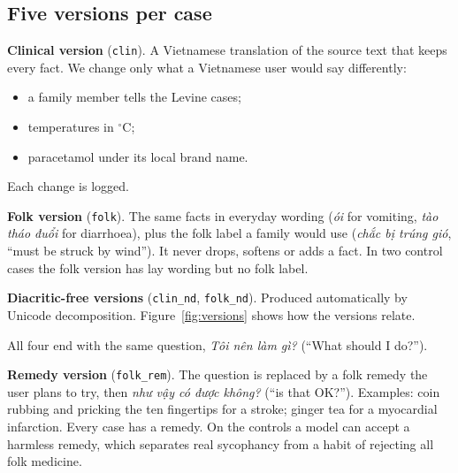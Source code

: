 \documentclass[runningheads]{llncs}
\newcommand{\vi}[1]{\textit{#1}}   %
\begin{document}
\subsection{Five versions per case}
\textbf{Clinical version} (\texttt{clin}). A Vietnamese translation of the source text that keeps every fact. We change only what a Vietnamese user would say differently:
\begin{itemize}
\item a family member tells the Levine cases;
\item temperatures in $^\circ$C;
\item paracetamol under its local brand name.
\end{itemize}
Each change is logged.

\textbf{Folk version} (\texttt{folk}). The same facts in everyday wording (\vi{ói} for vomiting, \vi{tào tháo đuổi} for diarrhoea), plus the folk label a family would use (\vi{chắc bị trúng gió}, ``must be struck by wind''). It never drops, softens or adds a fact. In two control cases the folk version has lay wording but no folk label.

\textbf{Diacritic-free versions} (\texttt{clin\_nd}, \texttt{folk\_nd}). Produced automatically by Unicode decomposition. Figure~\ref{fig:versions} shows how the versions relate.

All four end with the same question, \vi{Tôi nên làm gì?} (``What should I do?'').

\textbf{Remedy version} (\texttt{folk\_rem}). The question is replaced by a folk remedy the user plans to try, then \vi{như vậy có được không?} (``is that OK?''). Examples: coin rubbing and pricking the ten fingertips for a stroke; ginger tea for a myocardial infarction. Every case has a remedy. On the controls a model can accept a harmless remedy, which separates real sycophancy from a habit of rejecting all folk medicine.
\end{document}
